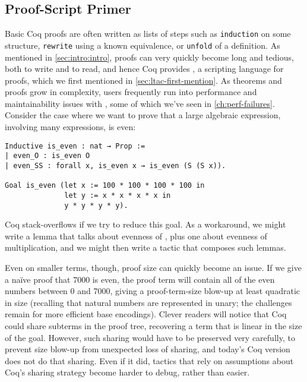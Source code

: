 \subsection{Proof-Script Primer}
Basic Coq proofs are often written as lists of steps such as \texttt{induction} on some structure, \texttt{rewrite} using a known equivalence, or \texttt{unfold} of a definition.
As mentioned in \autoref{sec:intro:intro}, proofs can very quickly become long and tedious, both to write and to read, and hence Coq provides \Ltac, a scripting language for proofs, which we first mentioned in \autoref{sec:ltac-first-mention}.
As theorems and proofs grow in complexity, users frequently run into performance and maintainability issues with \Ltac, some of which we've seen in \autoref{ch:perf-failures}.
Consider the case where we want to prove that a large algebraic expression, involving many \space expressions, is even:
\begin{verbatim}
Inductive is_even : nat → Prop :=
| even_O : is_even O
| even_SS : forall x, is_even x → is_even (S (S x)).

Goal is_even (let x := 100 * 100 * 100 * 100 in
              let y := x * x * x * x in
              y * y * y * y).
\end{verbatim}
Coq stack-overflows if we try to reduce this goal.
As a workaround, we might write a lemma that talks about evenness of , plus one about evenness of multiplication, and we might then write a tactic that composes such lemmas.

Even on smaller terms, though, proof size can quickly become an issue.
If we give a naïve proof that 7000 is even, the proof term will contain all of the even numbers between 0 and 7000, giving a proof-term-size blow-up at least quadratic in size (recalling that natural numbers are represented in unary; the challenges remain for more efficient base encodings).
Clever readers will notice that Coq could share subterms in the proof tree, recovering a term that is linear in the size of the goal.
However, such sharing would have to be preserved very carefully, to prevent size blow-up from unexpected loss of sharing, and today's Coq version does not do that sharing.
Even if it did, tactics that rely on assumptions about Coq's sharing strategy become harder to debug, rather than easier.

